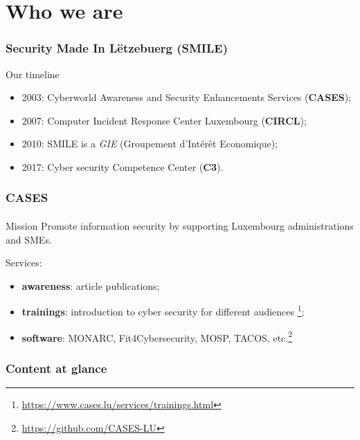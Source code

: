 %
%
\section*{Who we are}
\begin{frame}
    \frametitle{Security Made In Lëtzebuerg (SMILE)}
    Our timeline
    \begin{center}
        \begin{itemize}
            \item 2003: Cyberworld Awareness and Security Enhancements Services (\textbf{CASES});
            \item 2007: Computer Incident Response Center Luxembourg (\textbf{CIRCL});
            \item 2010: SMILE is a \textit{GIE} (Groupement d’Intérêt Economique);
            \item 2017: Cyber security Competence Center (\textbf{C3}).
        \end{itemize}
    \end{center}
\end{frame}

\begin{frame}
    \frametitle{CASES}
    \framesubtitle{}
    \begin{block}{Mission}
        Promote information security by supporting Luxembourg administrations and SMEs.
    \end{block}
    \bigskip
    Services:
    \begin{center}
        \begin{itemize}
            \item \textbf{awareness}: article publications;
            \item \textbf{trainings}:
                introduction to cyber security for different audiences \footnote{\url{https://www.cases.lu/services/trainings.html}};
            \item \textbf{software}:
                MONARC, Fit4Cybersecurity, MOSP, TACOS, etc.\footnote{\url{https://github.com/CASES-LU}}
        \end{itemize}
    \end{center}
\end{frame}

\setcounter{tocdepth}{1}
\begin{frame}
    \frametitle{Content at glance}
    \tableofcontents
\end{frame}
\setcounter{tocdepth}{4}

